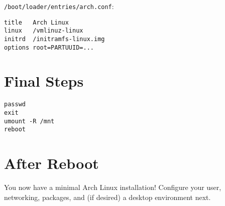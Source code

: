\documentclass[12pt]{book}
\begin{document}
\texttt{/boot/loader/entries/arch.conf}:
\begin{lstlisting}
title   Arch Linux
linux   /vmlinuz-linux
initrd  /initramfs-linux.img
options root=PARTUUID=...
\end{lstlisting}

\chapter{Final Steps}
\begin{lstlisting}
passwd
exit
umount -R /mnt
reboot
\end{lstlisting}

\chapter{After Reboot}
You now have a minimal Arch Linux installation! Configure your user, networking, packages, and (if desired) a desktop environment next.
\end{document}
